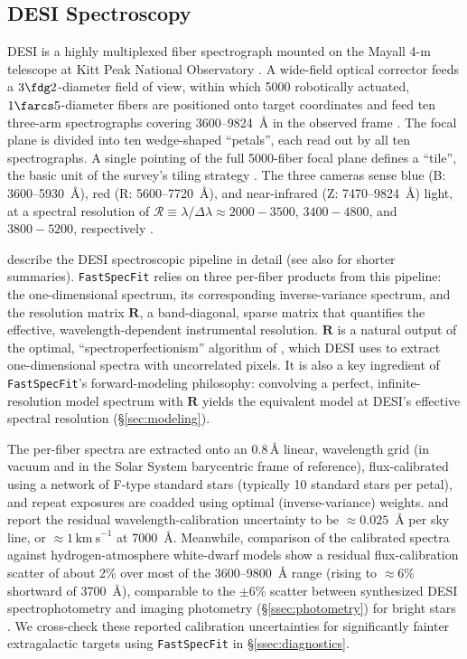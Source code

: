\documentclass[modern,linenumbers]{aastex701}
\newcommand{\fastspecfit}{\texttt{FastSpecFit}}
\newcommand{\kms}{\ensuremath{\mathrm{km~s}^{-1}}}
\begin{document}
\subsection{DESI Spectroscopy}
\label{ssec:spectra}

DESI is a highly multiplexed fiber spectrograph mounted on the Mayall
4-m telescope at Kitt Peak National Observatory
\citep{desi-collaboration16b, abareshi22a}.  A wide-field optical
corrector \citep{miller24a} feeds a $3\fdg2$-diameter field of view,
within which 5000 robotically actuated, $1\farcs5$-diameter fibers
\citep{poppett24a} are positioned onto target coordinates and feed ten
three-arm spectrographs covering 3600--9824~\AA{} in the observed
frame \citep{guy23a}. The focal plane is divided into ten wedge-shaped
``petals'', each read out by all ten spectrographs. A single pointing
of the full 5000-fiber focal plane defines a ``tile'', the basic unit
of the survey's tiling strategy \citep{schlafly23a}. The three cameras
sense blue (B: 3600--5930~\AA), red (R: 5600--7720~\AA), and
near-infrared (Z: 7470--9824~\AA) light, at a spectral resolution of
$\mathcal{R}\equiv\lambda/\Delta\lambda \approx 2000-3500$,
$3400-4800$, and $3800-5200$, respectively \citep{guy23a}.

\citet{guy23a} describe the DESI spectroscopic pipeline in detail (see
also \citealt{desi-collaboration24d, desi-collaboration26a} for
shorter summaries). \fastspecfit{} relies on three per-fiber products
from this pipeline: the one-dimensional spectrum, its corresponding
inverse-variance spectrum, and the resolution matrix $\mathbf{R}$, a
band-diagonal, sparse matrix that quantifies the effective,
wavelength-dependent instrumental resolution. $\mathbf{R}$ is a
natural output of the optimal, ``spectroperfectionism'' algorithm of
\citet{bolton10a}, which DESI uses to extract one-dimensional spectra
with uncorrelated pixels. It is also a key ingredient of
\fastspecfit's forward-modeling philosophy: convolving a perfect,
infinite-resolution model spectrum with $\mathbf{R}$ yields the
equivalent model at DESI's effective spectral resolution
(\S\ref{sec:modeling}).

The per-fiber spectra are extracted onto an 0.8\,\AA{} linear,
wavelength grid (in vacuum and in the Solar System barycentric frame
of reference), flux-calibrated using a network of F-type standard
stars (typically 10 standard stars per petal), and repeat exposures
are coadded using optimal (inverse-variance) weights. \citet{guy23a}
and \citet{koposov26a} report the residual wavelength-calibration
uncertainty to be $\approx0.025$~\AA{} per sky line, or
$\approx1$\,\kms{} at 7000~\AA. Meanwhile, comparison of the
calibrated spectra against hydrogen-atmosphere white-dwarf models show
a residual flux-calibration scatter of about 2\% over most of the
3600--9800~\AA{} range (rising to $\approx6\%$ shortward of 3700~\AA),
comparable to the $\pm6\%$ scatter between synthesized DESI
spectrophotometry and imaging photometry (\S\ref{ssec:photometry}) for
bright stars \citep{guy23a}. We cross-check these reported calibration
uncertainties for significantly fainter extragalactic targets using
\fastspecfit{} in \S\ref{ssec:diagnostics}.
\end{document}
